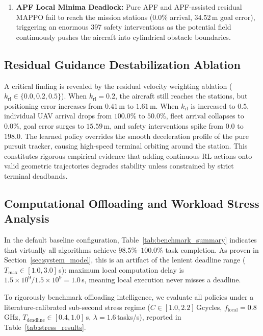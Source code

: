 \documentclass[conference]{IEEEtran}
\begin{document}
\begin{enumerate}
\begin{itemize}
        \item \textit{Fleet Mission Failure:} Crucially, both IPPO and Pure MAPPO achieve a Fleet Mission Success rate of \textbf{$0.0\%$}; neither unguided MARL fleet can reliably complete the mission without deliberative geometric guidance.
    \end{itemize}
    \item \textbf{APF Local Minima Deadlock:} Pure APF and APF-assisted residual MAPPO fail to reach the mission stations ($0.0\%$ arrival, $34.52$\,m goal error), triggering an enormous 397 safety interventions as the potential field continuously pushes the aircraft into cylindrical obstacle boundaries.
\end{enumerate}

\subsection{Residual Guidance Destabilization Ablation}
A critical finding is revealed by the residual velocity weighting ablation ($k_{\text{rl}} \in \{0.0, 0.2, 0.5\}$). When $k_{\text{rl}} = 0.2$, the aircraft still reaches the stations, but positioning error increases from $0.41$\,m to $1.61$\,m. When $k_{\text{rl}}$ is increased to $0.5$, individual UAV arrival drops from $100.0\%$ to $50.0\%$, fleet arrival collapses to $0.0\%$, goal error surges to $15.59$\,m, and safety interventions spike from $0.0$ to $198.0$. The learned policy overrides the smooth deceleration profile of the pure pursuit tracker, causing high-speed terminal orbiting around the station. This constitutes rigorous empirical evidence that adding continuous RL actions onto valid geometric trajectories degrades stability unless constrained by strict terminal deadbands.

\subsection{Computational Offloading and Workload Stress Analysis}
In the default baseline configuration, Table~\ref{tab:benchmark_summary} indicates that virtually all algorithms achieve $98.5\%$--$100.0\%$ task completion. As proven in Section~\ref{sec:system_model}, this is an artifact of the lenient deadline range ($T_{\text{max}} \in [1.0, 3.0]$\,s): maximum local computation delay is $1.5 \times 10^9 / 1.5 \times 10^9 = 1.0$\,s, meaning local execution never misses a deadline.

To rigorously benchmark offloading intelligence, we evaluate all policies under a literature-calibrated sub-second stress regime ($C \in [1.0, 2.2]$\,Gcycles, $f_{\text{local}} = 0.8$\,GHz, $T_{\text{deadline}} \in [0.4, 1.0]$\,s, $\lambda = 1.6$\,tasks/s), reported in Table~\ref{tab:stress_results}.
\end{document}
